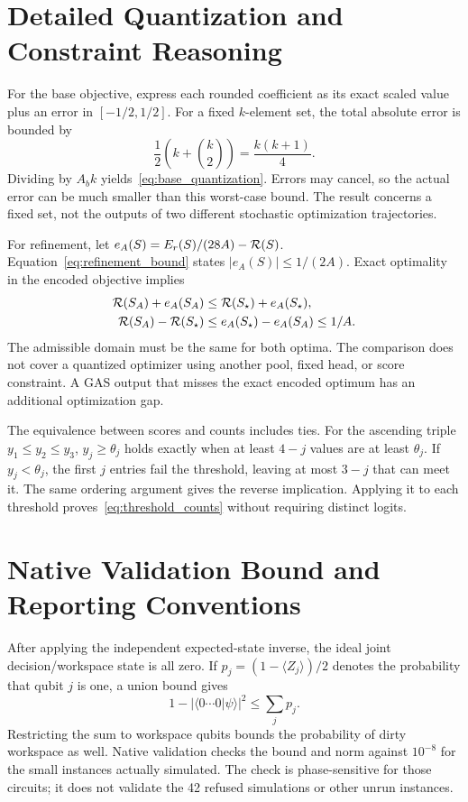 \appendices
\section{Detailed Quantization and Constraint Reasoning}\label{app:bounds}
For the base objective, express each rounded coefficient as its exact scaled value plus an error in $[-1/2,1/2]$. For a fixed $k$-element set, the total absolute error is bounded by
\begin{equation}
\frac{1}{2}\left(k+\binom{k}{2}\right)=\frac{k(k+1)}{4}.
\end{equation}
Dividing by $A_bk$ yields~\eqref{eq:base_quantization}. Errors may cancel, so the actual error can be much smaller than this worst-case bound. The result concerns a fixed set, not the outputs of two different stochastic optimization trajectories.

For refinement, let $e_A(S)=E_r(S)/(28A)-\mathcal{R}(S)$. Equation~\eqref{eq:refinement_bound} states $|e_A(S)|\leq1/(2A)$. Exact optimality in the encoded objective implies
\begin{align}
\mathcal{R}(S_A)+e_A(S_A)&\leq\mathcal{R}(S_\star)+e_A(S_\star),\\
\mathcal{R}(S_A)-\mathcal{R}(S_\star)&\leq e_A(S_\star)-e_A(S_A)\leq1/A.
\end{align}
The admissible domain must be the same for both optima. The comparison does not cover a quantized optimizer using another pool, fixed head, or score constraint. A GAS output that misses the exact encoded optimum has an additional optimization gap.

The equivalence between scores and counts includes ties. For the ascending triple $y_1\leq y_2\leq y_3$, $y_j\geq\theta_j$ holds exactly when at least $4-j$ values are at least $\theta_j$. If $y_j<\theta_j$, the first $j$ entries fail the threshold, leaving at most $3-j$ that can meet it. The same ordering argument gives the reverse implication. Applying it to each threshold proves~\eqref{eq:threshold_counts} without requiring distinct logits.

\section{Native Validation Bound and Reporting Conventions}\label{app:validation}
After applying the independent expected-state inverse, the ideal joint decision/workspace state is all zero. If $p_j=(1-\langle Z_j\rangle)/2$ denotes the probability that qubit $j$ is one, a union bound gives
\begin{equation}
1-|\langle 0\cdots0|\psi\rangle|^2\leq\sum_j p_j.
\label{eq:validation_bound}
\end{equation}
Restricting the sum to workspace qubits bounds the probability of dirty workspace as well. Native validation checks the bound and norm against $10^{-8}$ for the small instances actually simulated. The check is phase-sensitive for those circuits; it does not validate the 42 refused simulations or other unrun instances.

